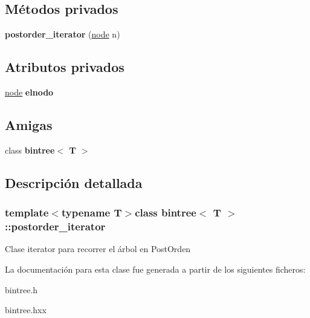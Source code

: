 \subsection*{Métodos privados}
\begin{DoxyCompactItemize}
\item 
\hypertarget{classbintree_1_1postorder__iterator_a25fece2e84ff80599afd2b739e9e522b}{}{\bfseries postorder\+\_\+iterator} (\hyperlink{classbintree_1_1node}{node} n)\label{classbintree_1_1postorder__iterator_a25fece2e84ff80599afd2b739e9e522b}

\end{DoxyCompactItemize}
\subsection*{Atributos privados}
\begin{DoxyCompactItemize}
\item 
\hypertarget{classbintree_1_1postorder__iterator_aba59818adb7d13684b090d7d3171f84a}{}\hyperlink{classbintree_1_1node}{node} {\bfseries elnodo}\label{classbintree_1_1postorder__iterator_aba59818adb7d13684b090d7d3171f84a}

\end{DoxyCompactItemize}
\subsection*{Amigas}
\begin{DoxyCompactItemize}
\item 
\hypertarget{classbintree_1_1postorder__iterator_a300e602ae13bd21fa092c5a5899e9eda}{}class {\bfseries bintree$<$ T $>$}\label{classbintree_1_1postorder__iterator_a300e602ae13bd21fa092c5a5899e9eda}

\end{DoxyCompactItemize}


\subsection{Descripción detallada}
\subsubsection*{template$<$typename T$>$class bintree$<$ T $>$\+::postorder\+\_\+iterator}

Clase iterator para recorrer el árbol en Post\+Orden 

La documentación para esta clase fue generada a partir de los siguientes ficheros\+:\begin{DoxyCompactItemize}
\item 
bintree.\+h\item 
bintree.\+hxx\end{DoxyCompactItemize}
